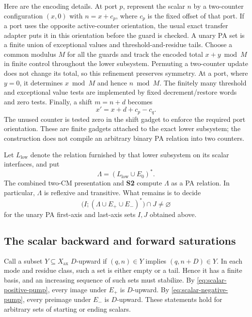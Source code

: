 \documentclass[11pt,a4paper]{article}
\theoremstyle{remark}
\begin{document}
Here are the encoding details.  At port \(p\), represent the scalar
\(n\) by a two-counter configuration \((x,0)\) with
\(n=x+c_p\), where \(c_p\) is the fixed offset of that port.  If a port
uses the opposite active-counter orientation, the usual exact transfer
adapter puts it in this orientation before the guard is checked.
A unary PA set is a finite union of exceptional values and
threshold-and-residue tails.  Choose a common modulus \(M\) for all
the guards and track the encoded total \(x+y\bmod M\) in finite
control throughout the lower subsystem.  Permuting a two-counter
update does not change its total, so this refinement preserves
symmetry.  At a port, where \(y=0\), it determines \(x\bmod M\)
and hence \(n\bmod M\).  The finitely many threshold and exceptional
value tests are implemented by fixed decrement/restore words and zero
tests.  Finally, a shift \(m=n+d\) becomes
\[
 x'=x+d+c_p-c_q.
\]
The unused counter is tested zero in the shift gadget to enforce the
required port orientation.  These are finite gadgets attached to the
exact lower subsystem; the construction does not compile an arbitrary
binary PA relation into two counters.

Let \(L_{\mathrm{low}}\) denote the relation furnished by that lower
subsystem on its scalar interfaces, and put
\begin{equation}
 \Lambda=(L_{\mathrm{low}}\cup E_0)^*.
 \label{eq:scalar-lower-closure}
\end{equation}
The combined two-CM presentation and \textbf{S2} compute \(\Lambda\)
as a PA relation.  In particular, \(\Lambda\) is reflexive and
transitive.  What remains is to decide
\begin{equation}
 \bigl(I;(\Lambda\cup E_+\cup E_-)^*\bigr)\cap J
 \neq\varnothing
 \label{eq:scalar-query}
\end{equation}
for the unary PA first-axis and last-axis sets \(I,J\) obtained above.

\subsection{The scalar backward and forward saturations}
Call a subset \(Y\subseteq X_{\mathrm{ax}}\) \(D\)-upward if
\((q,n)\in Y\) implies \((q,n+D)\in Y\).  In each mode and residue
class, such a set is either empty or a tail.  Hence it has a finite
basis, and an increasing sequence of such sets must stabilize.  By
\eqref{eq:scalar-positive-pump}, every image under \(E_+\) is
\(D\)-upward.  By \eqref{eq:scalar-negative-pump}, every preimage
under \(E_-\) is \(D\)-upward.  These statements hold for arbitrary
sets of starting or ending scalars.
\end{document}
